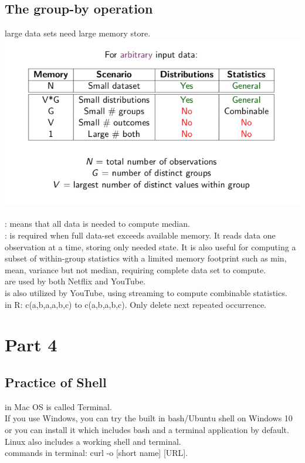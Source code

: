 \subsection{The group-by operation}
 large data sets need large memory store. 
\begingroup\centering
\includegraphics{figures/dda}\\
\endgroup\\
\noindent
{}: means that all data is needed to compute median. \\
: is required when full data-set exceeds available memory. It reads data one observation at a time, storing only needed state. It is also useful for computing a subset of within-group statistics with a limited memory footprint such as min, mean, variance but not median, requiring complete data set to compute.\\
 are used by both Netflix and YouTube.\\
 is also utilized by YouTube, using streaming to compute combinable statistics. \\ 
 in R: c(a,b,a,a,b,c) to c(a,b,a,b,c). Only delete next repeated occurrence. \\
\section{Part 4}
\subsection{Practice of Shell}
 in Mac OS is called Terminal. \\
If you use Windows, you can try the built in bash/Ubuntu shell on Windows 10 or you can install it which includes bash and a terminal application by default. Linux also includes a working shell and terminal.\\
 commands in terminal: curl -o [short name] [URL].
